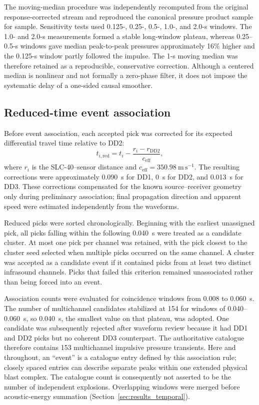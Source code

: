 \documentclass[]{seismica}
\begin{document}
The moving-median procedure was independently recomputed from the original
response-corrected stream and reproduced the canonical pressure product sample
for sample. Sensitivity tests used 0.125-, 0.25-, 0.5-, 1.0-, and 2.0-s
windows. The 1.0- and 2.0-s measurements formed a stable long-window plateau,
whereas 0.25--0.5-s windows gave median peak-to-peak pressures approximately
16\% higher and the 0.125-s window partly followed the impulse. The 1-s moving
median was therefore retained as a reproducible, conservative correction.
Although a centered median is nonlinear and not formally a zero-phase filter,
it does not impose the systematic delay of a one-sided causal smoother.

\subsection{Reduced-time event association}

Before event association, each accepted pick was corrected for its expected differential travel time relative to DD2:
\begin{equation}
  t_{i,\mathrm{red}} = t_i - \frac{r_i-r_{\mathrm{DD2}}}{c_{\mathrm{eff}}},
  \label{eq:reduced_time}
\end{equation}
where $r_i$ is the SLC-40--sensor distance and $c_{\mathrm{eff}}=350.98~\mathrm{m\,s^{-1}}$. The resulting corrections were approximately 0.090~s for DD1, 0~s for DD2, and 0.013~s for DD3. These corrections compensated for the known source--receiver geometry only during preliminary association; final propagation direction and apparent speed were estimated independently from the waveforms.

Reduced picks were sorted chronologically. Beginning with the earliest unassigned pick, all picks falling within the following 0.040~s were treated as a candidate cluster. At most one pick per channel was retained, with the pick closest to the cluster seed selected when multiple picks occurred on the same channel. A cluster was accepted as a candidate event if it contained picks from at least two distinct infrasound channels. Picks that failed this criterion remained unassociated rather than being forced into an event.

Association counts were evaluated for coincidence windows from 0.008 to
0.060~s. The number of multichannel candidates stabilized at 154 for windows
of 0.040--0.060~s, so 0.040~s, the smallest value on that plateau, was adopted.
One candidate was subsequently rejected after waveform review because it had
DD1 and DD2 picks but no coherent DD3 counterpart. The authoritative catalogue
therefore contains 153 multichannel impulsive pressure transients. Here and
throughout, an ``event'' is a catalogue entry defined by this association rule;
closely spaced entries can describe separate peaks within one extended physical
blast complex. The catalogue count is consequently not asserted to be the
number of independent explosions. Overlapping windows were merged before
acoustic-energy summation (Section~\ref{sec:results_temporal}).
\end{document}
